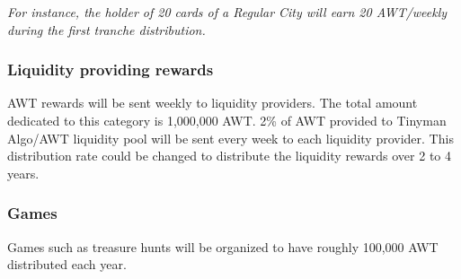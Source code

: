 \documentclass{article}
\begin{document}
\textit{For instance, the holder of 20 cards of a Regular City will earn 20 AWT/weekly during the first tranche distribution.}

\subsubsection{Liquidity providing rewards}
\label{sssec:liquidity-providing-rewards}

AWT rewards will be sent weekly to liquidity providers. The total amount dedicated to this category is 1,000,000 AWT.
2\% of AWT provided to Tinyman Algo/AWT liquidity pool will be sent every week to each liquidity provider. This distribution rate could be changed to distribute the liquidity rewards over 2 to 4 years.

\subsubsection{Games}
\label{sssec:games}

Games such as treasure hunts will be organized to have roughly 100,000 AWT distributed each year.
\end{document}
